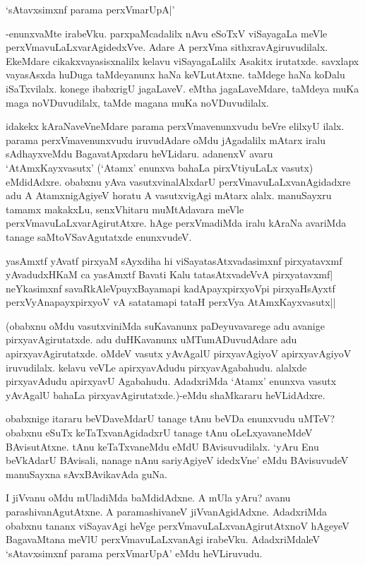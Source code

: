 \begin{shloka}
`sAtavxsimxnf parama perxVmarUpA|'
\end{shloka}

-enunxvaMte irabeVku. parxpaMcadalilx nAvu eSoTxV viSayagaLa meVle perxVmavuLaLxvarAgidedxVve. Adare A perxVma sithxravAgiruvudilalx. EkeMdare cikakxvayasisxnalilx kelavu viSayagaLalilx Asakitx irutatxde. savxlapx vayasAsxda huDuga taMdeyanunx haNa keVLutAtxne. taMdege haNa koDalu iSaTxvilalx. konege ibabxrigU jagaLaveV. eMtha jagaLaveMdare, taMdeya muKa maga noVDuvudilalx, taMde magana muKa noVDuvudilalx.

idakekx kAraNaveVneMdare parama perxVmavenunxvudu beVre elilxyU ilalx. parama perxVmavenunxvudu iruvudAdare oMdu jAgadalilx mAtarx iralu sAdhayxveMdu BagavatApxdaru heVLidaru. adanenxV avaru `AtAmxKayxvasutx' (`Atamx' enunxva bahaLa pirxVtiyuLaLx vasutx) eMdidAdxre. obabxnu yAva vasutxvinalAlxdarU perxVmavuLaLxvanAgidadxre adu A AtamxnigAgiyeV horatu A vasutxvigAgi mAtarx alalx. manuSayxru tamamx makakxLu, senxVhitaru muMtAdavara meVle perxVmavuLaLxvarAgirutAtxre. hAge perxVmadiMda iralu kAraNa avariMda tanage saMtoVSavAgutatxde enunxvudeV.

\begin{shloka}
yasAmxtf yAvatf pirxyaM sAyxdiha hi viSayatasAtxvadasimxnf pirxyatavxmf\\
yAvadudxHKaM ca yasAmxtf Bavati Kalu tatasAtxvadeVvA pirxyatavxmf|\\
neYkasimxnf savaRkAleV\s puyxBayamapi kadA\s payxpirxyoV\s pi pirxyaHsAyxtf\\
perxVyAnapayxpirxyoV vA satatamapi tataH perxVya AtAmxKayxvasutx||
\end{shloka}

(obabxnu oMdu vasutxviniMda suKavanunx paDeyuvavarege adu avanige pirxyavAgirutatxde. adu duHKavanunx uMTumADuvudAdare adu apirxyavAgirutatxde. oMdeV vasutx yAvAgalU pirxyavAgiyoV apirxyavAgiyoV iruvudilalx. kelavu veVLe apirxyavAdudu pirxyavAgabahudu. alalxde pirxyavAdudu apirxyavU Agabahudu. AdadxriMda `Atamx' enunxva vasutx yAvAgalU bahaLa pirxyavAgirutatxde.)-eMdu shaMkararu heVLidAdxre.

obabxnige itararu beVDaveMdarU tanage tAnu beVDa enunxvudu uMTeV? obabxnu eSuTx keTaTxvanAgidadxrU tanage tAnu oLeLxyavaneMdeV BAvisutAtxne. tAnu keTaTxvaneMdu eMdU BAvisuvudilalx. `yAru Enu beVkAdarU BAvisali, nanage nAnu sariyAgiyeV idedxVne' eMdu BAvisuvudeV manuSayxna sAvxBAvikavAda guNa.

I jiVvanu oMdu mUladiMda baMdidAdxne. A mUla yAru? avanu parashivanAgutAtxne. A paramashivaneV jiVvanAgidAdxne. AdadxriMda obabxnu tananx viSayavAgi heVge perxVmavuLaLxvanAgirutAtxnoV hAgeyeV BagavaMtana meVlU perxVmavuLaLxvanAgi irabeVku. AdadxriMdaleV `sAtavxsimxnf parama perxVmarUpA' eMdu heVLiruvudu.

